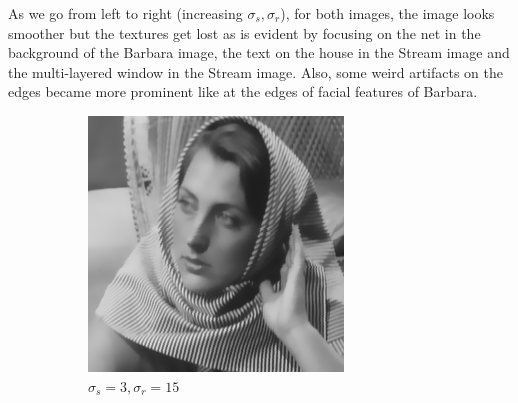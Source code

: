 \documentclass[a4paper, landscape]{article}
\begin{document}
As we go from left to right (increasing $\sigma_s, \sigma_r$), for both images, the image looks smoother but the textures get lost as is evident by focusing on the net in the background of the Barbara image, the text on the house in the Stream image and the multi-layered window in the Stream image. Also, some weird artifacts on the edges became more prominent like at the edges of facial features of Barbara.
\begin{figure}
    \centering
    \begin{subfigure}{0.48\linewidth}
        \centering
        \includegraphics[width=\linewidth]{barbara256,σ_spatial3,σ_range15.png}
        \caption{$\sigma_s=3, \sigma_r=15$}
    \end{subfigure}
    \begin{subfigure}{0.48\linewidth}
        \centering

\end{subfigure}
\end{figure}
\end{document}
